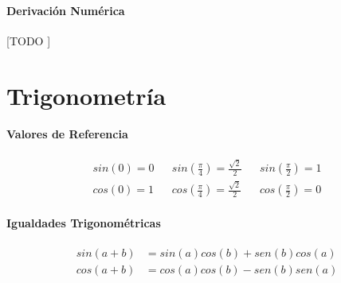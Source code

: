 \documentclass{article}
\begin{document}
\begin{multicols}{2}
      \paragraph{Derivación Numérica}
      [TODO ]


    \appendix
    \section{Trigonometría}

      \paragraph{Valores de Referencia}

      \begin{align*}
        sin\left(0\right) = 0 && sin\left(\frac{\pi}{4}\right) = \frac{\sqrt{2}}{2} && sin\left(\frac{\pi}{2}\right) = 1 \\
        cos\left(0\right) = 1 && cos\left(\frac{\pi}{4}\right) = \frac{\sqrt{2}}{2} && cos\left(\frac{\pi}{2}\right) = 0
      \end{align*}

      \paragraph{Igualdades Trigonométricas}

      \begin{align*}
        sin(a + b) &= sin(a)cos(b) + sen(b)cos(a) \\
        cos(a + b) &= cos(a)cos(b) - sen(b)sen(a)
      \end{align*}

      
  \end{multicols}
\end{document}
